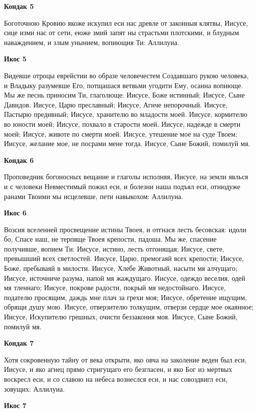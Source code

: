 \medskip
\bfseries Кондак 5\normalfont{}


Боготочною
Кровию якоже искупил еси нас древле от законныя клятвы, Иисусе, сице изми нас от сети, еюже змий запят ны страстьми плотскими, и блудным наваждением, и злым унынием, вопиющия Ти: Аллилуиа.


\medskip
\bfseries Икос 5\normalfont{}


Видевше
отроцы еврейстии во образе человечестем Создавшаго рукою человека, и Владыку разумевше Его, потщашася ветвьми угодити Ему, осанна вопиюще. Мы же песнь приносим Ти, глаголюще: Иисусе, Боже истинный; Иисусе, Сыне Давидов. Иисусе, Царю преславный; Иисусе, Агнче непорочный. Иисусе, Пастырю предивный; Иисусе, хранителю во младости моей. Иисусе, кормителю во юности моей; Иисусе, похвало в старости моей. Иисусе, надежде в смерти моей; Иисусе, животе по смерти моей. Иисусе, утешение мое на суде Твоем; Иисусе, желание мое, не посрами мене тогда. Иисусе, Сыне Божий, помилуй мя.


\medskip
\bfseries Кондак 6\normalfont{}


Проповедник
богоносных вещание и глаголы исполняя, Иисусе, на земли явлься и с человеки Невместимый пожил еси, и болезни наша подъял еси, отнюдуже ранами Твоими мы исцелевше, пети навыкохом: Аллилуиа.


\medskip
\bfseries Икос 6\normalfont{}


Возсия
вселенней просвещение истины Твоея, и отгнася лесть бесовская: идоли бо, Спасе наш, не терпяще Твоея крепости, падоша. Мы же, спасение получивше, вопием Ти: Иисусе, истино, лесть отгонящая; Иисусе, свете, превышший всех светлостей. Иисусе, Царю, премогаяй всех крепости; Иисусе, Боже, пребываяй в милости. Иисусе, Хлебе Животный, насыти мя алчущаго; Иисусе, источниче разума, напой мя жаждущаго. Иисусе, одеждо веселия, одей мя тленнаго; Иисусе, покрове радости, покрый мя недостойнаго. Иисусе, подателю просящим, даждь мне плач за грехи моя; Иисусе, обретение ищущим, обрящи душу мою. Иисусе, отверзителю толкущим, отверзи сердце мое окаянное; Иисусе, Искупителю грешных, очисти беззакония моя. Иисусе, Сыне Божий, помилуй мя.


\medskip
\bfseries Кондак 7\normalfont{}


Хотя
сокровенную тайну от века открыти, яко овча на заколение веден был еси, Иисусе, и яко агнец прямо стригущаго его безгласен, и яко Бог из мертвых воскресл еси, и со славою на небеса вознеслся еси, и нас совоздвигл еси, зовущих: Аллилуиа. 


\medskip
\bfseries Икос 7\normalfont{}


